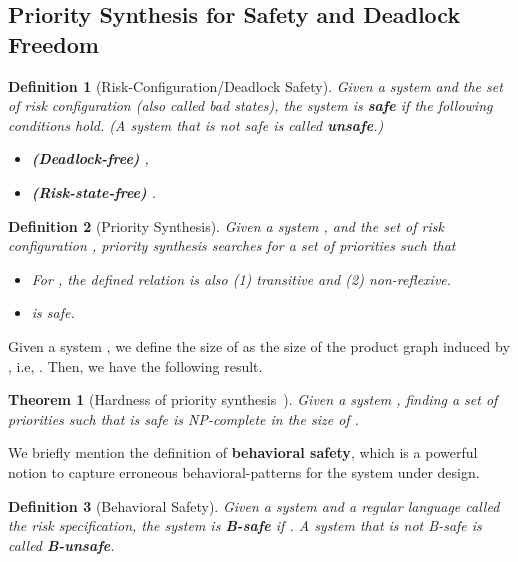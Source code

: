 \documentclass[10pt, a4paper, onecolumn, conference, compsocconf]{IEEEtran}
\newtheorem{defi}{Definition}
\newtheorem{theo}{Theorem}
\begin{document}
\subsection{Priority Synthesis for Safety and Deadlock Freedom\label{subsec.algo.prioritysyn.def.priority.syn}}


\begin{defi}[Risk-Configuration/Deadlock Safety]
  Given a system  and the set
  of \emph{risk configuration}  (also called \emph{bad states}), the system is \textbf{safe}
  if the following conditions hold. (A system that is not safe is called \textbf{unsafe}.)


\begin{itemize}
    \item {\bf (Deadlock-free)}
, 
\item {\bf (Risk-state-free)}
.
\end{itemize}
\end{defi}


\begin{defi}[Priority Synthesis]
  Given a system , and the
  set of risk configuration , priority synthesis
  searches for a set of priorities  such that
 \begin{itemize}
    \item For , the defined relation  is also (1) transitive and (2) non-reflexive.
    \item  is safe.
 \end{itemize}
\end{defi}

Given a system ,  we define the size of  as the size of the product graph induced by , i.e, . Then, we have the following result.

\begin{theo}[Hardness of priority synthesis~\cite{cheng:hardness:2011}]
  Given a system , finding a set
   of priorities such that
   is safe is NP-complete in the size of .
\end{theo}



We briefly mention the definition of \textbf{behavioral safety}, which is a powerful notion to capture erroneous behavioral-patterns
for the system under design.
\begin{defi}[Behavioral Safety]
  Given a system  and a regular language  called the \emph{risk specification}, the system is \textbf{B-safe} if . A system that is not B-safe is called \textbf{B-unsafe}.
\end{defi}
\end{document}
